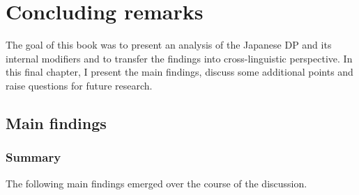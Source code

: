 \chapter{Concluding remarks} \label{concluding}

The goal of this book was to present an analysis of the Japanese DP and its internal modifiers and to transfer the findings into cross-linguistic perspective. In this final chapter, I present the main findings, discuss some additional points and raise questions for future research.

\section{Main findings}

\subsection{Summary}

The following main findings emerged over the course of the discussion.

